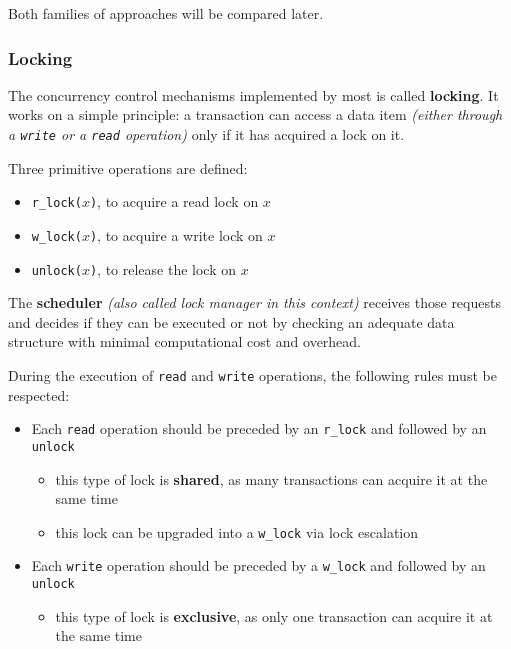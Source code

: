 \documentclass[english]{article}
\begin{document}
Both families of approaches will be compared later.

\subsubsection{Locking}

The concurrency control mechanisms implemented by most \DBMS is called \textbf{locking}.
It works on a simple principle: a transaction can access a data item \textit{(either through a \texttt{write} or a \texttt{read} operation)} only if it has acquired a lock on it.

Three primitive operations are defined:

\begin{itemize}
  \item \texttt{r\_lock(\(x\))}, to acquire a read lock on \(x\)
  \item \texttt{w\_lock(\(x\))}, to acquire a write lock on \(x\)
  \item \texttt{unlock(\(x\))}, to release the lock on \(x\)
\end{itemize}

The \textbf{scheduler} \textit{(also called lock manager in this context)} receives those requests and decides if they can be executed or not by checking an adequate data structure with minimal computational cost and overhead.

During the execution of \texttt{read} and \texttt{write} operations, the following rules must be respected:

\begin{itemize}
  \item Each \texttt{read} operation should be preceded by an \texttt{r\_lock} and followed by an \texttt{unlock}
        \begin{itemize}
          \item this type of lock is \textbf{shared}, as many transactions can acquire it at the same time
          \item this lock can be upgraded into a \texttt{w\_lock} via lock escalation
        \end{itemize}
  \item Each \texttt{write} operation should be preceded by a \texttt{w\_lock} and followed by an \texttt{unlock}
        \begin{itemize}
          \item this type of lock is \textbf{exclusive}, as only one transaction can acquire it at the same time
        \end{itemize}
\end{itemize}
\end{document}
